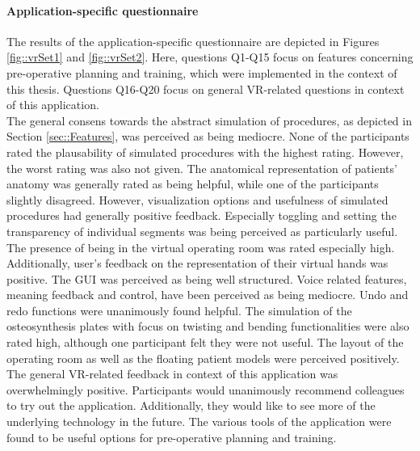 \paragraph{Application-specific questionnaire}
The results of the application-specific questionnaire are depicted
in Figures \ref{fig::vrSet1} and \ref{fig::vrSet2}.
Here, questions Q1-Q15 focus on features concerning
pre-operative planning and training, 
which were implemented in the context of this thesis.
Questions Q16-Q20 focus on general VR-related
questions in context of this application.
\\ The general consens towards the abstract simulation of procedures,
as depicted in Section \ref{sec::Features}, was perceived as 
being mediocre. None of the participants rated the plausability
of simulated procedures with the highest rating.
However, the worst rating was also not given. The anatomical 
representation of patients' anatomy was generally rated as being
helpful, while one of the participants slightly disagreed. 
However, visualization options and usefulness of simulated procedures
had generally positive feedback. Especially toggling and setting the 
transparency of individual segments was being perceived as particularly
useful.
The presence of being in the virtual operating room was rated
especially high. Additionally, user's feedback on the representation
of their virtual hands was positive. 
The GUI was perceived as being well structured.
Voice related features, meaning feedback and control, have been
perceived as being mediocre. 
Undo and redo functions were unanimously found helpful.
The simulation of the osteosynthesis plates with focus on
twisting and bending functionalities were also rated high,
although one participant felt they were not useful.
The layout of the operating room as well as the floating patient
models were perceived positively. 
\\ The general VR-related feedback in context of this application
was overwhelmingly positive. 
Participants would unanimously recommend colleagues to try
out the application. Additionally, they would like to see
more of the underlying technology in the future.
The various tools of the application were found to be 
useful options for pre-operative planning and training.

